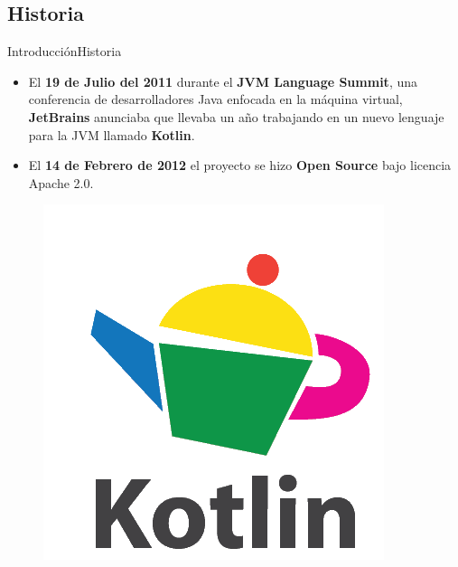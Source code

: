 \subsection{Historia}
\begin{frame}{Introducción}{Historia}
 \begin{itemize}
  \item<1-> El \textbf{19 de Julio del 2011} durante el \textbf{JVM Language Summit}, una conferencia de desarrolladores Java enfocada en la máquina virtual,
  \textbf{JetBrains} anunciaba que llevaba un año trabajando en un nuevo lenguaje para la JVM llamado \textbf{Kotlin}.
  \item<2-> El \textbf{14 de Febrero de 2012} el proyecto se hizo \textbf{Open Source} bajo licencia Apache 2.0.
 \end{itemize}
 \begin{figure}[!htb]
    \endminipage
    \includegraphics[width=\linewidth]{images/introduction/kotlin_logo_0}
    \endminipage
    \endminipage
   \end{figure}
\end{frame}
